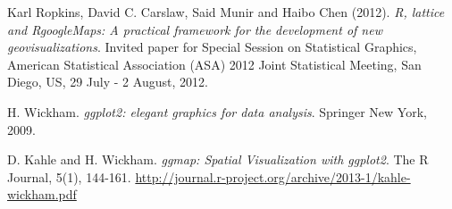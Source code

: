 \documentclass[a4paper,11pt,twoside,openright]{book}							%
\begin{document}
\begin{thebibliography}{99}
Karl Ropkins, David C. Carslaw, Said Munir and Haibo Chen (2012). \emph{R, lattice and RgoogleMaps: A practical framework for the development of new geovisualizations}. Invited paper for Special Session on Statistical Graphics, American Statistical Association (ASA) 2012 Joint Statistical Meeting, San Diego, US, 29 July - 2 August, 2012.

H. Wickham. \emph{ggplot2: elegant graphics for data analysis}. Springer New York, 2009.

D. Kahle and H. Wickham. \emph{ggmap: Spatial Visualization with ggplot2}. The R Journal, 5(1), 144-161. \href{http://journal.r-project.org/archive/2013-1/kahle-wickham.pdf}{http://journal.r-project.org/archive/2013-1/kahle-wickham.pdf}

\end{thebibliography}
\end{document}
